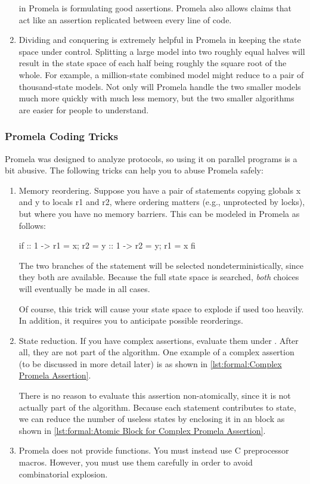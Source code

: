\begin{enumerate}
	in Promela is formulating good assertions.
	Promela also allows  claims that act like an assertion
	replicated between every line of code.
\item	Dividing and conquering is extremely helpful in Promela in keeping
	the state space under control.
	Splitting a large model into two roughly equal halves will result
	in the state space of each half being roughly the square root of
	the whole.
	For example, a million-state combined model might reduce to a
	pair of thousand-state models.
	Not only will Promela handle the two smaller models much more
	quickly with much less memory, but the two smaller algorithms
	are easier for people to understand.
\end{enumerate}


\subsubsection{Promela Coding Tricks}
\label{sec:formal:Promela Coding Tricks}

Promela was designed to analyze protocols, so using it on parallel programs
is a bit abusive.
The following tricks can help you to abuse Promela safely:

\begin{enumerate}
\item	Memory reordering.
	Suppose you have a pair of statements copying globals x and y
	to locals r1 and r2, where ordering matters
        (e.g., unprotected by locks), but where you have no memory barriers.
	This can be modeled in Promela as follows:

\begin{VerbatimN}[samepage=true]
if
:: 1 -> r1 = x;
        r2 = y
:: 1 -> r2 = y;
        r1 = x
fi
\end{VerbatimN}

	The two branches of the  statement will be selected
	nondeterministically, since they both are available.
	Because the full state space is searched, \emph{both} choices
	will eventually be made in all cases.

	Of course, this trick will cause your state space to explode
	if used too heavily.
	In addition, it requires you to anticipate possible reorderings.

\item	State reduction.
	If you have complex assertions, evaluate them under .
	After all, they are not part of the algorithm.
	One example of a complex assertion (to be discussed in more
	detail later) is as shown in
	\cref{lst:formal:Complex Promela Assertion}.

	There is no reason to evaluate this assertion
	non-atomically, since it is not actually part of the algorithm.
	Because each statement contributes to state, we can reduce
	the number of useless states by enclosing it in an 
	block as shown in
	\cref{lst:formal:Atomic Block for Complex Promela Assertion}.

\item	Promela does not provide functions.
	You must instead use C preprocessor macros.
	However, you must use them carefully in order to avoid
	combinatorial explosion.
\end{enumerate}


